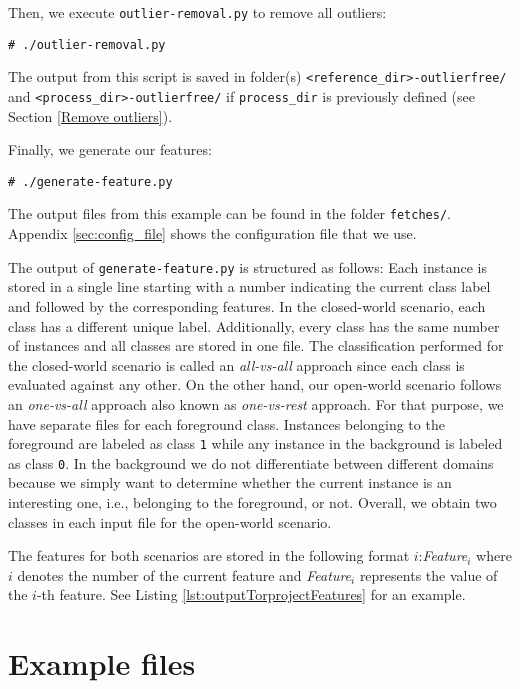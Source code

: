 Then, we execute \texttt{outlier-removal.py} to remove all outliers:
\begin{verbatim}
# ./outlier-removal.py
\end{verbatim}
The output from this script is saved in folder(s) \texttt{<reference\_dir>-outlierfree/} and \texttt{<process\_dir>-outlierfree/} if \texttt{process\_dir} is previously defined (see Section \ref{Remove outliers}).

Finally, we generate our features:
\begin{verbatim}
# ./generate-feature.py
\end{verbatim}
The output files from this example can be found in the folder \texttt{fetches/}. Appendix \ref{sec:config_file} shows the configuration file that we use.

The output of \texttt{generate-feature.py} is structured as follows: Each instance is stored in a single line starting with a number indicating the current class label and followed by the corresponding features. In the closed-world scenario, each class has a different unique label. Additionally, every class has the same number of instances and all classes are stored in one file. The classification performed for the closed-world scenario is called an \emph{all-vs-all} approach since each class is evaluated against any other. On the other hand, our open-world scenario follows an \emph{one-vs-all} approach also known as \emph{one-vs-rest} approach. For that purpose, we have separate files for each foreground class. Instances belonging to the foreground are labeled as class \texttt{1} while any instance in the background is labeled as class \texttt{0}. In the background we do not differentiate between different domains because we simply want to determine whether the current instance is an interesting one, i.e., belonging to the foreground, or not. Overall, we obtain two classes in each input file for the open-world scenario. 

The features for both scenarios are stored in the following format $i$:\emph{Feature}$_i$ where $i$ denotes the number of the current feature and \emph{Feature}$_i$ represents the value of the $i$-th feature. See Listing \ref{lst:outputTorprojectFeatures} for an example.


\section{Example files}
%

